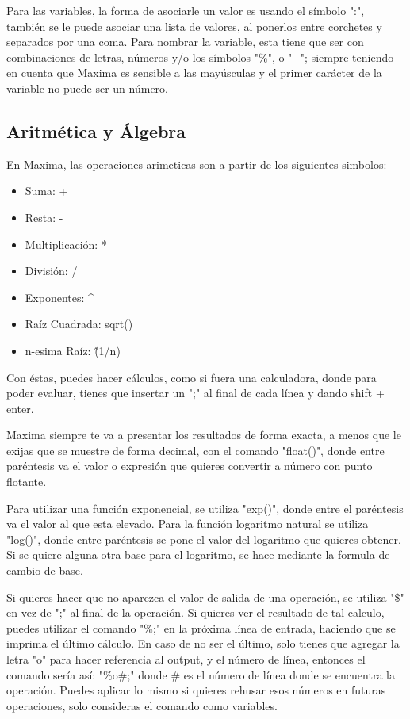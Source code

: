 \documentclass[a4paper]{article}
\begin{document}
\bigskip

Para las variables, la forma de asociarle un valor es usando el símbolo ":", también se le puede asociar una lista de valores, al ponerlos entre corchetes y separados por una coma. Para nombrar la variable, esta tiene que ser con combinaciones de letras, números y/o los símbolos "\%", o "\_"; siempre teniendo en cuenta que Maxima es sensible a las mayúsculas y el primer carácter de la variable no puede ser un número.  

\subsection{Aritmética y Álgebra}
En Maxima, las operaciones arimeticas son a partir de los siguientes simbolos:
\begin{itemize}
\item Suma: +
\item Resta: -
\item Multiplicación: *
\item División: /
\item Exponentes: \textasciicircum
\item Raíz Cuadrada: sqrt()
\item n-esima Raíz: \^(1/n)
\end{itemize}
Con éstas, puedes hacer cálculos, como si fuera una calculadora, donde para poder evaluar, tienes que insertar un ";" al final de cada línea y dando shift + enter. 

\bigskip

Maxima siempre te va a presentar los resultados de forma exacta, a menos que le exijas que se muestre de forma decimal, con el comando "float()", donde entre paréntesis va el valor o expresión que quieres convertir a número con punto flotante. 

Para utilizar una función exponencial, se utiliza "exp()", donde entre el paréntesis va el valor al que esta elevado. Para la función logaritmo natural se utiliza "log()", donde entre paréntesis se pone el valor del logaritmo que quieres obtener. Si se quiere alguna otra base para el logaritmo, se hace mediante la formula de cambio de base.  

\bigskip

Si quieres hacer que no aparezca el valor de salida de una operación, se utiliza "\$" en vez de ";" al final de la operación. Si quieres ver el resultado de tal calculo, puedes utilizar el comando "\%;" en la próxima línea de entrada, haciendo que se imprima el último cálculo. En caso de no ser el último, solo tienes que agregar la letra "o" para hacer referencia al output, y el número de línea, entonces el comando sería así: "\%o\#;" donde \# es el número de línea donde se encuentra la operación. Puedes aplicar lo mismo si quieres rehusar esos números en futuras operaciones, solo consideras el comando como variables. 
\end{document}
